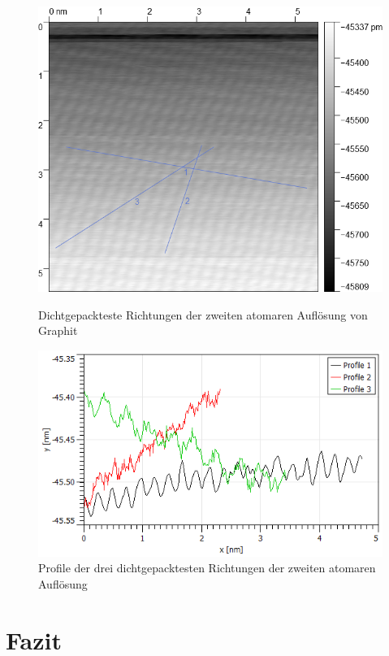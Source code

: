 \documentclass[12pt,a4paper]{scrartcl}
\numberwithin{equation}{section} %
\begin{document}
\begin{figure}[h!]
	\begin{minipage}[t]{0.4\textwidth}
		\includegraphics[width=\linewidth]{../media/B2.5/Atoms2_with_profileLines.png}
		\caption{Dichtgepackteste Richtungen der zweiten atomaren Auflösung von Graphit}
		\label{abb:hopg_with_profile_2}
	\end{minipage}
	\begin{minipage}[t]{0.5\textwidth}
		\centering
		\includegraphics[width=\linewidth]{../media/B2.5/profilePlot_area2.png}
		\caption{Profile der drei dichtgepacktesten Richtungen der zweiten atomaren Auflösung}
		\label{abb:hopg_profile_2}
	\end{minipage}
\end{figure}

\clearpage
\hypertarget{fazit}{%
\section{Fazit}\label{fazit}}
\end{document}
